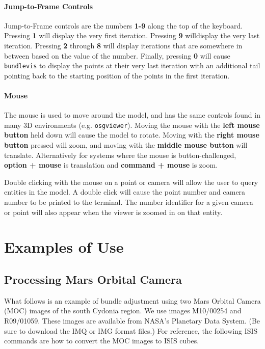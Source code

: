 \paragraph{Jump-to-Frame Controls}
Jump-to-Frame controls are the numbers \textbf{1-9} along the top of
the keyboard. Pressing \textbf{1} will display the very first
iteration. Pressing \textbf{9} willdisplay the very last
iteration. Pressing \textbf{2} through \textbf{8} will display
iterations that are somewhere in between based on the value of the
number. Finally, pressing \textbf{0} will cause \texttt{bundlevis} to
display the points at their very last iteration with an additional
tail pointing back to the starting position of the points in the first
iteration.

\paragraph{Mouse}
The mouse is used to move around the model, and has the same controls
found in many 3D environments (e.g. \texttt{osgviewer}). Moving the
mouse with the \textbf{left mouse button} held down will cause the
model to rotate.  Moving with the \textbf{right mouse button} pressed
will zoom, and moving with the \textbf{middle mouse button} will
translate. Alternatively for systems where the mouse is
button-challenged, \textbf{option + mouse} is translation and
\textbf{command + mouse} is zoom. 

Double clicking with the mouse on a point or camera will allow the
user to query entities in the model.  A double click will cause the
point number and camera number to be printed to the terminal. The
number identifier for a given camera or point will also appear when
the viewer is zoomed in on that entity.

\section{Examples of Use}

\subsection{Processing Mars Orbital Camera}

What follows is an example of bundle adjustment using two Mars Orbital
Camera (MOC) images of the south Cydonia region. We use images
M10/00254 and R09/01059. These images are available from NASA's
Planetary Data System.  (Be sure to download the IMQ or IMG format
files.) For reference, the following ISIS commands are how to convert
the MOC images to ISIS cubes.

